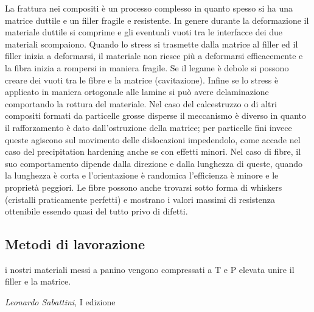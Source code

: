 \documentclass{article}
\begin{document}
La frattura nei compositi è un processo complesso in quanto spesso si ha una matrice duttile e un filler fragile e resistente. In genere durante la deformazione il materiale duttile si comprime e gli eventuali vuoti tra le interfacce dei due materiali scompaiono. Quando lo stress si trasmette dalla matrice al filler ed il filler inizia a deformarsi, il materiale non riesce più a deformarsi efficacemente e la fibra inizia a rompersi in maniera fragile. Se il legame è debole si possono creare dei vuoti tra le fibre e la matrice (cavitazione). Infine se lo stress è applicato in maniera ortogonale alle lamine si può avere delaminazione comportando la rottura del materiale.
Nel caso del calcestruzzo o di altri compositi formati da particelle grosse disperse il meccanismo è diverso in quanto il rafforzamento è dato dall'ostruzione della matrice; per particelle fini invece queste agiscono sul movimento delle dislocazioni impedendolo, come accade nel caso del precipitation hardening anche se con effetti minori.
Nel caso di fibre, il suo comportamento dipende dalla direzione e dalla lunghezza di queste, quando la lunghezza è corta e l'orientazione è randomica l'efficienza è minore e le proprietà peggiori. Le fibre possono anche trovarsi sotto forma di whiskers (cristalli praticamente perfetti) e mostrano i valori massimi di resistenza ottenibile essendo quasi del tutto privo di difetti.

\subsection{Metodi di lavorazione}

\epigraph{i nostri materiali messi a panino vengono compressati a T e P elevata unire il filler e la matrice.}{\textit{Leonardo Sabattini}, I edizione}
\end{document}
